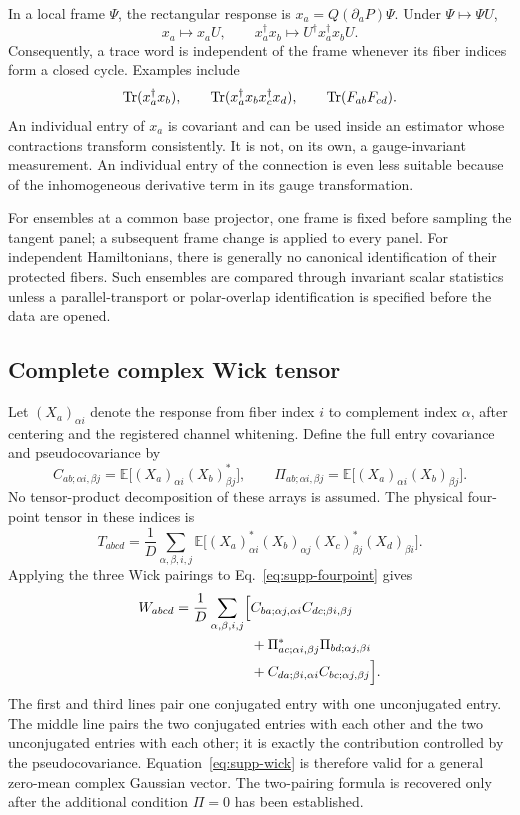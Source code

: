 In a local frame $\Psi$, the rectangular response is
$x_a=Q(\partial_aP)\Psi$.  Under $\Psi\mapsto\Psi U$,
\[
 x_a\mapsto x_aU,
 \qquad
 x_a^\dagger x_b\mapsto U^\dagger x_a^\dagger x_bU.
\]
Consequently, a trace word is independent of the frame whenever its fiber
indices form a closed cycle.  Examples include
\[
 \operatorname{Tr}(x_a^\dagger x_b),\qquad
 \operatorname{Tr}(x_a^\dagger x_bx_c^\dagger x_d),\qquad
 \operatorname{Tr}(F_{ab}F_{cd}).
\]
An individual entry of $x_a$ is covariant and can be used inside an estimator
whose contractions transform consistently.  It is not, on its own, a
gauge-invariant measurement.  An individual entry of the connection is even
less suitable because of the inhomogeneous derivative term in its gauge
transformation.

For ensembles at a common base projector, one frame is fixed before sampling
the tangent panel; a subsequent frame change is applied to every panel.  For
independent Hamiltonians, there is generally no canonical identification of
their protected fibers.  Such ensembles are compared through invariant scalar
statistics unless a parallel-transport or polar-overlap identification is
specified before the data are opened.

\subsection{Complete complex Wick tensor}

Let $(X_a)_{\alpha i}$ denote the response from fiber index $i$ to complement
index $\alpha$, after centering and the registered channel whitening.  Define
the full entry covariance and pseudocovariance by
\[
 C_{ab;\alpha i,\beta j}
 =\mathbb E\bigl[(X_a)_{\alpha i}(X_b)_{\beta j}^{*}\bigr],
 \qquad
\Pi_{ab;\alpha i,\beta j}
 =\mathbb E\bigl[(X_a)_{\alpha i}(X_b)_{\beta j}\bigr].
\]
No tensor-product decomposition of these arrays is assumed.  The physical
four-point tensor in these indices is
\begin{equation}
 T_{abcd}=\frac{1}{D}\sum_{\alpha,\beta,i,j}
 \mathbb E\bigl[
 (X_a)_{\alpha i}^{*}(X_b)_{\alpha j}
 (X_c)_{\beta j}^{*}(X_d)_{\beta i}
 \bigr].
 \label{eq:supp-fourpoint}
\end{equation}
Applying the three Wick pairings to Eq.~\eqref{eq:supp-fourpoint} gives
\begin{align}
 W_{abcd}=\frac{1}{D}\sum_{\alpha,\beta,i,j}\Bigl[{}
 &C_{ba;\alpha j,\alpha i}C_{dc;\beta i,\beta j}
 \nonumber\\
 &+\Pi_{ac;\alpha i,\beta j}^{*}\Pi_{bd;\alpha j,\beta i}
 \nonumber\\
 &+C_{da;\beta i,\alpha i}C_{bc;\alpha j,\beta j}
 \Bigr].
 \label{eq:supp-wick}
\end{align}
The first and third lines pair one conjugated entry with one unconjugated
entry.  The middle line pairs the two conjugated entries with each other and
the two unconjugated entries with each other; it is exactly the contribution
controlled by the pseudocovariance.  Equation~\eqref{eq:supp-wick} is therefore
valid for a general zero-mean complex Gaussian vector.  The two-pairing formula
is recovered only after the additional condition $\Pi=0$ has been established.

